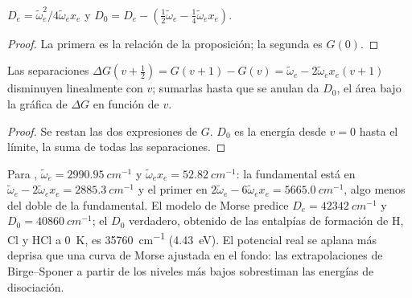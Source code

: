\begin{corollary}\label{cor:b3:rovibrational-spectroscopy:de}
$D_e = \tilde\omega_e^2/4\tilde\omega_ex_e$ y $D_0 = D_e - (\frac12\tilde\omega_e -
\frac14\tilde\omega_ex_e)$.
\end{corollary}

\begin{proof}
La primera es la relación de la proposición; la segunda es $G(0)$.
\end{proof}

\begin{proposition}\label{prop:b3:rovibrational-spectroscopy:birge-sponer}
Las separaciones $\Delta G(v + \frac12) = G(v+1) - G(v) = \tilde\omega_e - 2\tilde\omega_ex_e(v +
1)$ disminuyen linealmente con $v$; sumarlas hasta que se anulan da $D_0$, el
área bajo la gráfica de $\Delta G$ en función de $v$.
\end{proposition}

\begin{proof}
Se restan las dos expresiones de $G$. $D_0$ es la energía desde $v = 0$ hasta el
límite, la suma de todas las separaciones.
\end{proof}

\begin{example}\label{ex:b3:rovibrational-spectroscopy:hcl}
Para , $\tilde\omega_e = \qty{2990.95}{cm^{-1}}$ y $\tilde\omega_ex_e =
\qty{52.82}{cm^{-1}}$: la fundamental está en $\tilde\omega_e - 2\tilde\omega_ex_e =
\qty{2885.3}{cm^{-1}}$ y el primer  en $2\tilde\omega_e - 6\tilde\omega_ex_e =
\qty{5665.0}{cm^{-1}}$, algo menos del doble de la fundamental. El modelo de Morse
predice $D_e = \qty{42342}{cm^{-1}}$ y $D_0 = \qty{40860}{cm^{-1}}$; el $D_0$ verdadero,
obtenido de las entalpías de formación de H, Cl y HCl a \qty{0}{K}, es
\qty{35760}{cm^{-1}} (\qty{4.43}{eV}). El potencial real se aplana más deprisa que una
curva de Morse ajustada en el fondo: las extrapolaciones de Birge--Sponer a partir de los
niveles más bajos sobrestiman las energías de disociación.
\end{example}

